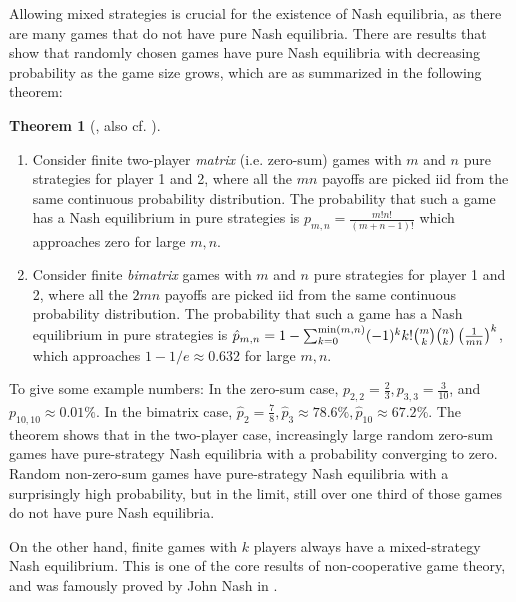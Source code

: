 \documentclass[a4paper,DIV=11,abstracton,twoside=semi]{scrreprt}
\theoremstyle{definition}
\newtheorem{thm}{Theorem}[chapter] %
\begin{document}
    Allowing mixed strategies is crucial for the existence of Nash equilibria, as there are many games that do not have pure Nash equilibria. There are results that show that randomly chosen games have pure Nash equilibria with decreasing probability as the game size grows, which are as summarized in the following theorem:
    \begin{thm}[{\cite{bib:goldbergProbabilityOfEquilibria}, also cf. \cites[p.15]{bib:matsumotoGameTheory}[Exercise 1.2]{bib:nisanAlgorithmicGameTheoryCh1Basic}}]~
        \label{thm:probabilityOfPureNashEquilibria}
        \begin{enumerate}
            \item
            Consider finite two-player \emph{matrix} (i.e. zero-sum) games with $m$ and $n$ pure strategies for player 1 and 2, where all the $mn$ payoffs are picked iid from the same continuous probability distribution.
            The probability that such a game has a Nash equilibrium in pure strategies is $p_{m, n} = \frac{m! n!}{(m+n-1)!}$ which approaches zero for large $m, n$.
            
            \item 
            Consider finite \emph{bimatrix} games with $m$ and $n$ pure strategies for player 1 and 2, where all the $2mn$ payoffs are picked iid from the same continuous probability distribution.
            The probability that such a game has a Nash equilibrium in pure strategies is 
            $\hat{p}_{m, n} = 1 - \sum_{k=0}^{\min(m, n)} (-1)^k k! \binom{m}{k} \binom{n}{k} \left(\frac{1}{mn}\right)^k$,
            which approaches $1 - 1/e \approx 0.632$ for large $m, n$.
        \end{enumerate}
    \end{thm}

    To give some example numbers: In the zero-sum case, $p_{2, 2} = \frac{2}{3}, p_{3, 3}=\frac{3}{10}$, and $p_{10, 10} \approx 0.01\%$. In the bimatrix case, $\hat{p}_{2} = \frac{7}{8}, \hat{p}_{3} \approx 78.6\%, \hat{p}_{10} \approx 67.2\%$.
    The theorem shows that in the two-player case, increasingly large random zero-sum games have pure-strategy Nash equilibria with a probability converging to zero. Random non-zero-sum games have pure-strategy Nash equilibria with a surprisingly high probability, but in the limit, still over one third of those games do not have pure Nash equilibria.
    
    On the other hand, finite games with $k$ players always have a mixed-strategy Nash equilibrium. This is one of the core results of non-cooperative game theory, and was famously proved by John Nash in \cite{bib:nashOnePageProofOfEquilibria}.
    
\end{document}
